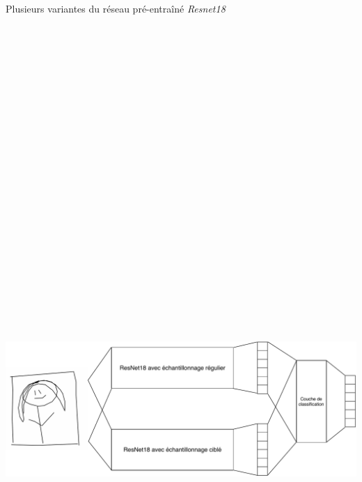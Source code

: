 \vspace{-15pt}
Plusieurs variantes du réseau pré-entraîné \emph{Resnet18}
\begin{center}

\includegraphics[width=39cm,height=39cm,keepaspectratio]{figures/structure_reseau.pdf}
      
\end{center}

